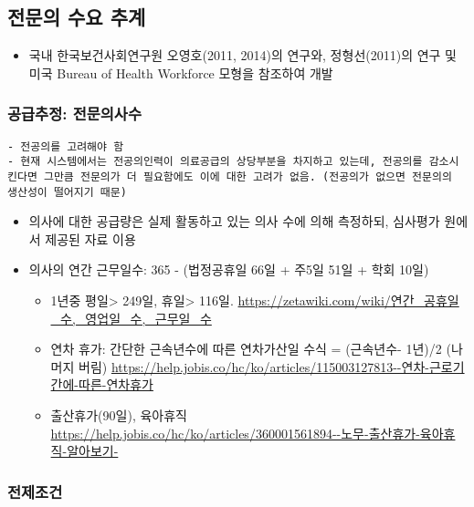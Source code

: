 \documentclass[]{book}
\providecommand{\tightlist}{%
  \setlength{\itemsep}{0pt}\setlength{\parskip}{0pt}}
\begin{document}
\hypertarget{section-3}{%
\subsection{전문의 수요 추계}\label{section-3}}

\begin{itemize}
\tightlist
\item
  국내 한국보건사회연구원 오영호(2011, 2014)의 연구와, 정형선(2011)의 연구 및 미국 Bureau of Health Workforce 모형을 참조하여 개발
\end{itemize}

\hypertarget{section-4}{%
\subsubsection{공급추정: 전문의사수}\label{section-4}}

\begin{verbatim}
- 전공의를 고려해야 함
- 현재 시스템에서는 전공의인력이 의료공급의 상당부분을 차지하고 있는데, 전공의를 감소시킨다면 그만큼 전문의가 더 필요함에도 이에 대한 고려가 없음. (전공의가 없으면 전문의의 생산성이 떨어지기 때문)
\end{verbatim}

\begin{itemize}
\item
  의사에 대한 공급량은 실제 활동하고 있는 의사 수에 의해 측정하되, 심사평가 원에서 제공된 자료 이용
\item
  의사의 연간 근무일수: 365 - (법정공휴일 66일 + 주5일 51일 + 학회 10일)

  \begin{itemize}
  \tightlist
  \item
    1년중 평일\textgreater{} 249일, 휴일\textgreater{} 116일. \url{https://zetawiki.com/wiki/연간_공휴일_수,_영업일_수,_근무일_수}
  \item
    연차 휴가: 간단한 근속년수에 따른 연차가산일 수식 = (근속년수- 1년)/2 (나머지 버림) \url{https://help.jobis.co/hc/ko/articles/115003127813--연차-근로기간에-따른-연차휴가}
  \item
    출산휴가(90일), 육아휴직 \url{https://help.jobis.co/hc/ko/articles/360001561894--노무-출산휴가-육아휴직-알아보기-}
  \end{itemize}
\end{itemize}

\hypertarget{section-5}{%
\subsubsection{전제조건}\label{section-5}}
\end{document}
